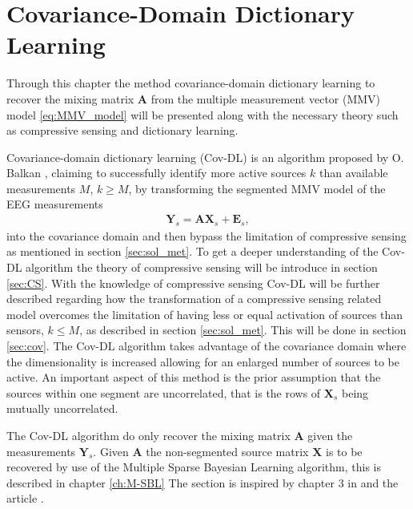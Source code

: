 \chapter{Covariance-Domain Dictionary \\ Learning}\label{ch:Cov-DL}
Through this chapter the method covariance-domain dictionary learning to recover the mixing matrix $\mathbf{A}$ from the multiple measurement vector (MMV) model \eqref{eq:MMV_model} will be presented along with the necessary theory such as compressive sensing and dictionary learning.

Covariance-domain dictionary learning (Cov-DL) is an algorithm proposed by O. Balkan \cite{Balkan2015}, claiming to successfully identify more active sources $k$ than available measurements $M$, $k \geq M$, by transforming the segmented MMV model of the EEG measurements
\begin{align*}
\mathbf{Y}_s = \mathbf{A} \mathbf{X}_s + \textbf{E}_s,
\end{align*}
into the covariance domain and then bypass the limitation of compressive sensing as mentioned in section \ref{sec:sol_met}. 
To get a deeper understanding of the Cov-DL algorithm the theory of compressive sensing will be introduce in section \ref{sec:CS}. 
With the knowledge of compressive sensing Cov-DL will be further described regarding how the transformation of a compressive sensing related model overcomes the limitation of having less or equal activation of sources than sensors, $k \leq M$, as described in section \ref{sec:sol_met}. This will be done in section \ref{sec:cov}.
The Cov-DL algorithm takes advantage of the covariance domain where the dimensionality is increased allowing for an enlarged number of sources to be active. 
An important aspect of this method is the prior assumption that the sources within one segment are uncorrelated, that is the rows of $\textbf{X}_s$ being mutually uncorrelated. 

The Cov-DL algorithm do only recover the mixing matrix $\mathbf{A}$ given the measurements $\textbf{Y}_s$. Given $\textbf{A}$ the non-segmented source matrix $\mathbf{X}$ is to be recovered by use of the Multiple Sparse Bayesian Learning algorithm, this is described in chapter \ref{ch:M-SBL} 
The section is inspired by chapter 3 in \cite{phd2015} and the article \cite{Balkan2015}.





